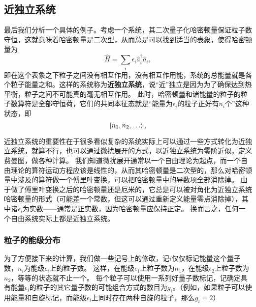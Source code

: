 \documentclass[hyperref, UTF8, a4paper]{ctexart}
\begin{document}
\subsection{近独立系统}

最后我们分析一个具体的例子。考虑一个系统，其二次量子化哈密顿量保证粒子数守恒，这就意味着哈密顿量是二次型，从而总是可以找到适当的表象，使得哈密顿量为
\begin{equation}
    \hat{H} = \sum_i \epsilon_i \hat{a}_i^\dagger \hat{a}_i,
\end{equation}
即在这个表象之下粒子之间没有相互作用，没有相互作用能，系统的总能量就是各个粒子能量之和。这样的系统称为\textbf{近独立系统}，说“近”独立是因为为了确保达到热平衡，粒子之间不可能真的毫无相互作用。
此时，哈密顿量和诸能量的粒子的粒子数算符是全部守恒荷，它们的共同本征态就是“能量为$\epsilon_i$的粒子正好有$n_i$个”这种状态，即
\[
    \ket{n_1, n_2, \ldots},
\]

近独立系统的重要性在于很多看似复杂的系统实际上可以通过一些方式转化为近独立系统，就算不行，也可以通过微扰展开的方式，以近独立系统为零阶近似，定义费曼图，做各种计算。
我们知道微扰展开通常以一个自由理论为起点，而一个自由理论的算符运动方程应该是线性的，从而其哈密顿量是二次型的，那么对哈密顿量中涉及的算符做一个傅里叶变换，可以把哈密顿量中的导数项全部消除掉。
由于做了傅里叶变换之后的哈密顿量还是厄米的，它总是可以被对角化为近独立系统哈密顿量的形式（可能差一个常数，但这可以通过重新定义能量零点消除掉），其中诸$\epsilon_i$为实数——通常是正实数，因为哈密顿量应保持正定。
换而言之，任何一个自由系统实际上都是近独立系统。

\subsubsection{粒子的能级分布}

为了方便接下来的计算，我们做一些记号上的修改，记$i$仅仅标记能量这个量子数，$n_i$为能级$\epsilon_i$上的粒子数。
这样，在能级$\epsilon_1$上粒子数为$n_1$，在能级$\epsilon_2$上粒子数为$n_2$，等等的状态就不止一个。
每个粒子可以使用一系列好量子数标记，记确定具有能量$\epsilon_i$的粒子的其它量子数的可能组合方式的数目为$g_i$。（例如，如果粒子可以使用能量和自旋标记，而能级$\epsilon_i$上同时存在两种自旋的粒子，那么$g_i=2$）
\end{document}
